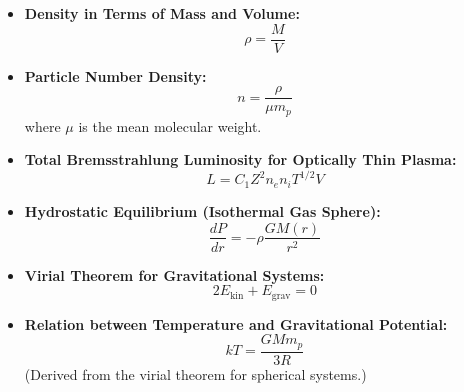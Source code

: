 \documentclass{article}
\begin{document}
\begin{itemize}
    \item \textbf{Density in Terms of Mass and Volume:}
          \[
              \rho = \frac{M}{V}
          \]
    \item \textbf{Particle Number Density:}
          \[
              n = \frac{\rho}{\mu m_p}
          \]
          where \( \mu \) is the mean molecular weight.
    \item \textbf{Total Bremsstrahlung Luminosity for Optically Thin Plasma:}
          \[
              L = C_1 Z^2 n_e n_i T^{1/2} V
          \]
    \item \textbf{Hydrostatic Equilibrium (Isothermal Gas Sphere):}
          \[
              \frac{dP}{dr} = -\rho \frac{G M(r)}{r^2}
          \]
    \item \textbf{Virial Theorem for Gravitational Systems:}
          \[
              2 E_{\text{kin}} + E_{\text{grav}} = 0
          \]
    \item \textbf{Relation between Temperature and Gravitational Potential:}
          \[
              k T = \frac{G M m_p}{3 R}
          \]
          (Derived from the virial theorem for spherical systems.)
\end{itemize}
\end{document}

